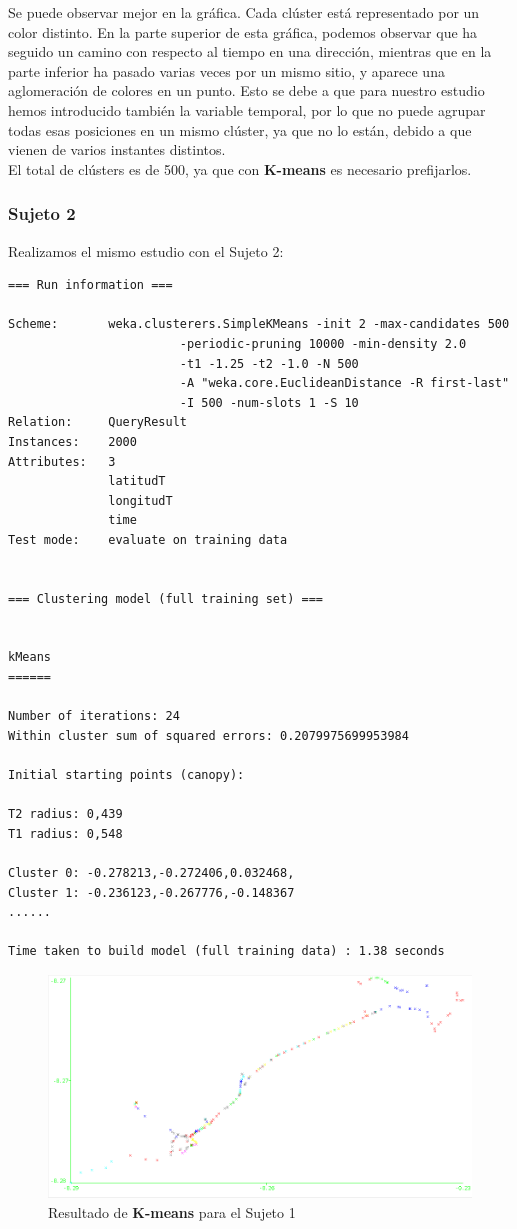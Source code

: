 \documentclass[a4paper, 12pt, spanish]{article}
\begin{document}
Se puede observar mejor en la gr\'afica. Cada cl\'uster est\'a representado por un color distinto. En la parte superior de esta gr\'afica, podemos observar que ha seguido un camino con respecto al tiempo en una direcci\'on, mientras que en la parte inferior ha pasado varias veces por un mismo sitio, y aparece una aglomeraci\'on de colores en un punto. Esto se debe a que para nuestro estudio hemos introducido tambi\'en la variable temporal, por lo que no puede agrupar todas esas posiciones en un mismo cl\'uster, ya que no lo est\'an, debido a que vienen de varios instantes distintos. \\

El total de cl\'usters es de 500, ya que con \textbf{K-means} es necesario prefijarlos.


\subsubsection{Sujeto 2}

Realizamos el mismo estudio con el Sujeto 2:\\

\begin{verbatim}
=== Run information ===

Scheme:       weka.clusterers.SimpleKMeans -init 2 -max-candidates 500 
						-periodic-pruning 10000 -min-density 2.0 
						-t1 -1.25 -t2 -1.0 -N 500 
						-A "weka.core.EuclideanDistance -R first-last" 
						-I 500 -num-slots 1 -S 10
Relation:     QueryResult
Instances:    2000
Attributes:   3
              latitudT
              longitudT
              time
Test mode:    evaluate on training data


=== Clustering model (full training set) ===


kMeans
======

Number of iterations: 24
Within cluster sum of squared errors: 0.2079975699953984

Initial starting points (canopy):

T2 radius: 0,439     
T1 radius: 0,548     

Cluster 0: -0.278213,-0.272406,0.032468,
Cluster 1: -0.236123,-0.267776,-0.148367
......

Time taken to build model (full training data) : 1.38 seconds
\end{verbatim}


\begin{figure}[H]
	\includegraphics[scale=.5]{../comparativa/kMeansSujeto2.png}
	\caption{Resultado de \textbf{K-means} para el Sujeto 1}
\end{figure}
\end{document}

